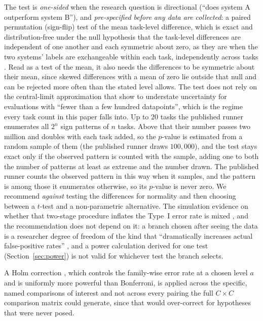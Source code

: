 \documentclass[11pt]{article}
\begin{document}
The test is \emph{one-sided} when the research question is directional (``does system A outperform
system B''), and \emph{pre-specified before any data are collected}: a paired permutation
(sign-flip) test of the mean task-level difference, which is exact and distribution-free under
the null hypothesis that the task-level differences are independent of one another and each symmetric about zero, as they are when the two systems' labels are exchangeable within each task, independently across tasks \citep{ernst2004permutation}. Read as a test of the mean, it also needs the differences to be symmetric about their mean, since skewed differences with a mean of zero lie outside that null and can be rejected more often than the stated level allows. The test does not
rely on the central-limit approximation that \citet{bowyer2025clt} show to understate
uncertainty for evaluations with ``fewer than a few hundred datapoints'', which is the regime every task count in this paper falls into. Up to $20$ tasks the published runner enumerates all $2^n$ sign patterns of $n$ tasks. Above that their number passes two million and doubles with each task added, so the $p$-value is estimated from a random sample of them (the published runner draws $100{,}000$), and the test stays exact only if the observed pattern is counted with the sample, adding one to both the number of patterns at least as extreme and the number drawn. The published runner counts the observed pattern in this way when it samples, and the pattern is among those it enumerates otherwise, so its $p$-value is never zero. We recommend \emph{against} testing the differences for normality and then choosing between a $t$-test and a non-parametric alternative. The simulation evidence on whether that two-stage procedure inflates the Type~I error rate is mixed \citep{schucany2006, rasch2011pretesting, rochon2012}, and the recommendation does not depend on it: a branch chosen after seeing the data is a researcher degree of freedom of the kind that ``dramatically increases actual false-positive rates'' \citep{simmons2011falsepositive}, and a power calculation derived for one test (Section~\ref{sec:power}) is not valid for whichever test the branch selects.

A Holm correction \citep{holm1979}, which controls the family-wise error rate at a chosen level $a$
and is uniformly more powerful than Bonferroni, is applied across the specific, named
comparisons of interest and not across every pairing the full $C \times C$ comparison matrix could generate, since that would over-correct for hypotheses that were never posed.
\end{document}
